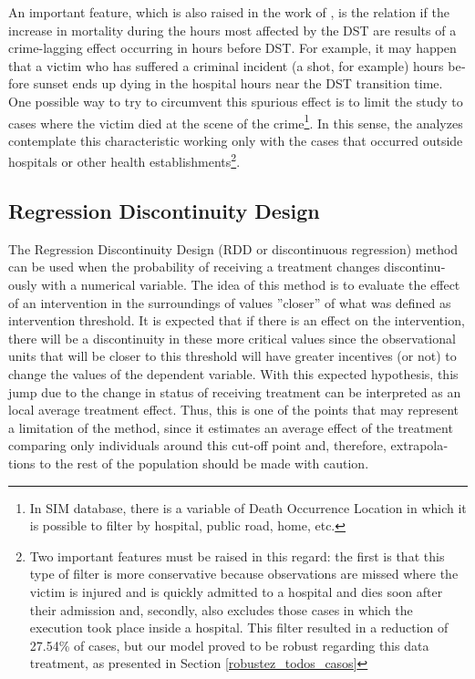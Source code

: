 \documentclass[12pt,openright,oneside,a4paper,english,french,spanish]{abntex2}
\numberwithin{table}{section} %
\numberwithin{figure}{section} %
\newcommand{\co}{\citeonline}
\begin{document}
\begin{otherlanguage}{english}
An important feature, which is also raised in the work of \co{toro2016}, is the relation if the increase in mortality during the hours most affected by the DST are results of a crime-lagging effect occurring in hours before DST. For example, it may happen that a victim who has suffered a criminal incident (a shot, for example) hours before sunset ends up dying in the hospital hours near the DST transition time. One possible way to try to circumvent this spurious effect is to limit the study to cases where the victim died at the scene of the crime\footnote{In SIM database, there is a variable of Death Occurrence Location in which it is possible to filter by hospital, public road, home, etc.}. In this sense, the analyzes contemplate this characteristic working only with the cases that occurred outside hospitals or other health establishments\footnote{Two important features must be raised in this regard: the first is that this type of filter is more conservative because observations are missed where the victim is injured and is quickly admitted to a hospital and dies soon after their admission and, secondly, also excludes those cases in which the execution took place inside a hospital. This filter resulted in a reduction of 27.54\% of cases, but our model proved to be robust regarding this data treatment, as presented in Section \ref{robustez_todos_casos}}.

\subsection{Regression Discontinuity Design\label{reg_desc_HV}}

The Regression Discontinuity Design (RDD or discontinuous regression) method can be used when the probability of receiving a treatment changes discontinuously with a numerical variable. The idea of this method is to evaluate the effect of an intervention in the surroundings of values ''closer'' of what was defined as intervention threshold. It is expected that if there is an effect on the intervention, there will be a discontinuity in these more critical values since the observational units that will be closer to this threshold will have greater incentives (or not) to change the values of the dependent variable. With this expected hypothesis, this jump due to the change in status of receiving treatment can be interpreted as an local average treatment effect. Thus, this is one of the points that may represent a limitation of the method, since it estimates an average effect of the treatment comparing only individuals around this cut-off point and, therefore, extrapolations to the rest of the population should be made with caution.


\end{otherlanguage}
\end{document}
